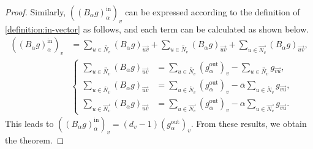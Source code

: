 \documentclass[10pt,a4paper]{amsart}
\begin{document}
\begin{proof}
	Similarly, $( \left( B_{\alpha} g \right)_{\alpha}^{\text{in}} )_{v}$ can be expressed according to the definition of \eqref{definition:in-vector} as follows,
	and each term can be calculated as shown below.
	\begin{align*}
		\left( \left( B_{\alpha} g \right)_{\alpha}^{\text{in}} \right)_{v} & =
		\sum_{u \in \overleftrightarrow{N_v}} \left( B_{\alpha} g \right)_{\overrightarrow{uv}}
		+ \sum_{u \in \overleftarrow{N_v}} \left( B_{\alpha} g \right)_{\overrightarrow{uv}}
		+ \sum_{u \in \overrightarrow{N_v}} \left( B_{\alpha} g \right)_{\overrightarrow{uv}}
		,                                                                                                                                                                                        \\
		                                                                    & \left\{\begin{aligned}
			                                                                             \sum_{u \in \overleftrightarrow{N_v}} \left( B_{\alpha} g \right)_{\overrightarrow{uv}} & =
			                                                                             \sum_{u \in \overleftrightarrow{N_v}} \left( g_{\alpha}^{\text{out}} \right)_{v}
			                                                                             - \sum_{u \in \overleftrightarrow{N_v}} g_{\overrightarrow{vu}}
			                                                                             ,                                                                                           \\
			                                                                             \sum_{u \in \overleftarrow{N_v}} \left( B_{\alpha} g \right)_{\overrightarrow{uv}}      & =
			                                                                             \sum_{u \in \overleftarrow{N_v}} \left( g_{\alpha}^{\text{out}} \right)_{v}
			                                                                             - \bar{\alpha} \sum_{u \in \overleftarrow{N_v}} g_{\overrightarrow{vu}}
			                                                                             ,                                                                                           \\
			                                                                             \sum_{u \in \overrightarrow{N_v}} \left( B_{\alpha} g \right)_{\overrightarrow{uv}}     & =
			                                                                             \sum_{u \in \overrightarrow{N_v}} \left( g_{\alpha}^{\text{out}} \right)_{v}
			                                                                             - \alpha \sum_{u \in \overrightarrow{N_v}} g_{\overrightarrow{vu}}
			                                                                             .
		                                                                             \end{aligned}\right.
	\end{align*}
	This leads to $( \left( B_{\alpha} g \right)_{\alpha}^{\text{in}} )_{v} = (d_v - 1) ( g_{\alpha}^{\text{out}} )_{v}$. From these results, we obtain the theorem.
\end{proof}
\end{document}
